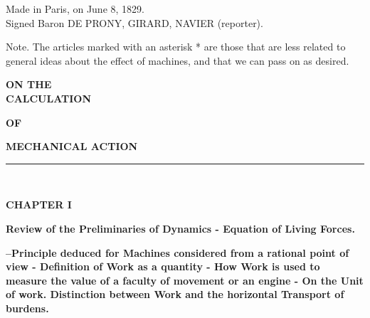 \documentclass{book}
\begin{document}
\begin{flushright}

 Made in Paris, on June 8, 1829. 
\\
Signed Baron DE PRONY, GIRARD, NAVIER (reporter).
\end{flushright}



\tableofcontents



\vfill
Note. The articles marked with an asterisk * are those that are less related to general ideas about the effect of machines, and that we can pass on as desired.

\clearpage %



\mainmatter
\pagestyle{fancy} %
\newpage  %

\begin{center}
\large\textbf{ON THE}\\
\vspace{3mm}
\huge\textbf{CALCULATION}\\ 
\vspace{3mm}

\large\textbf{OF} \\ 
\vspace{3mm}

\huge\textbf{MECHANICAL ACTION}
\end{center}
\vspace{3mm}

\par\noindent\rule{\textwidth}{2pt}\\

\vspace{5mm}

\begin{center}
\huge\bfseries CHAPTER I
\end{center}
\vspace{10mm} %


\textbf{Review of the Preliminaries of Dynamics - Equation of Living Forces.}

\textbf{–Principle deduced for Machines considered from a rational point of view - Definition of Work as a quantity - How Work is used to measure the value of a faculty of movement or an engine - On the Unit of work. Distinction between Work and the horizontal Transport of burdens.}
\vspace{26pt}
\\
\vspace{4mm}
\end{document}
